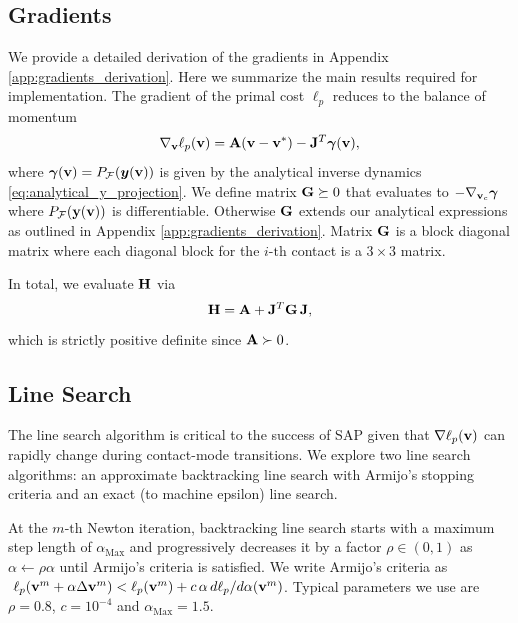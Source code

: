 \subsection{Gradients}
\label{sec:gradients}

We provide a detailed derivation of the gradients in Appendix
\ref{app:gradients_derivation}. Here we summarize the main results required for
implementation. The gradient of the primal cost $\ell_p$ reduces to the balance
of momentum
\begin{equation*}
	\nabla_{\mathbf{v}}\ell_p({\mathbf{v}}) = {\mathbf{A}}({\mathbf{v}}-{\mathbf{v}}^*) - {\mathbf{J}}^T{\bm\gamma}({\mathbf{v}}),
\end{equation*}
where ${\bm\gamma}({\mathbf{v}})=P_\mathcal{F}({\bm{y}}({\mathbf{v}}))$ is given by the analytical
inverse dynamics \eqref{eq:analytical_y_projection}. We define matrix
${\mathbf{G}}\succeq 0$ that evaluates to $-\nabla_{{\mathbf{v}}_c}{\bm\gamma}$ where
$P_\mathcal{F}({\mathbf{y}}({\mathbf{v}}))$ is differentiable. Otherwise ${\mathbf{G}}$ extends
our analytical expressions as outlined in Appendix
\ref{app:gradients_derivation}. Matrix ${\mathbf{G}}$ is a block diagonal matrix where
each diagonal block for the $i\text{-th}$ contact is a $3\times 3$ matrix.

In total, we evaluate ${\mathbf{H}}$ via
\begin{equation*}
	{\mathbf{H}} = {\mathbf{A}} + {\mathbf{J}}^T{\mathbf{G}}\,{\mathbf{J}},
\end{equation*}
which is strictly positive definite since ${\mathbf{A}}\succ 0$.

\subsection{Line Search}

The line search algorithm is critical to the success of SAP given that $\nabla
\ell_p({\mathbf{v}})$ can rapidly change during contact-mode transitions.  We explore
two line search algorithms: an approximate backtracking line search with
Armijo's stopping criteria and an exact (to machine epsilon) line search.

At the $m\text{-th}$ Newton iteration, backtracking line search starts with a
maximum step length of $\alpha_\text{Max}$ and progressively decreases it
by a factor $\rho \in (0, 1)$ as $\alpha\gets\rho\alpha$ until Armijo's
criteria \cite[\S 3.1]{bib:nocedal2006numerical} is satisfied. We write Armijo's
criteria as $~\ell_p({\mathbf{v}}^m + \alpha \Delta{\mathbf{v}}^{m}) < \ell_p({\mathbf{v}}^m) +
c\,\alpha\,d\ell_p/d\alpha({\mathbf{v}}^m)$. Typical parameters we use are
$\rho=0.8$, $c=10^{-4}$ and $\alpha_\text{Max}=1.5$.


